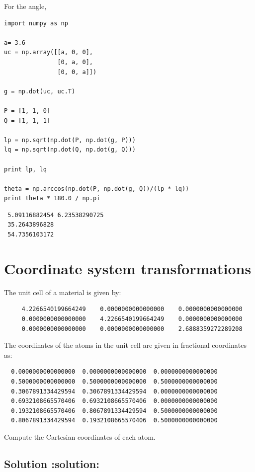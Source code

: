 \documentclass{article}
\begin{document}
For the angle, 


\begin{verbatim}
import numpy as np

a= 3.6
uc = np.array([[a, 0, 0],
               [0, a, 0],
               [0, 0, a]])

g = np.dot(uc, uc.T)

P = [1, 1, 0]
Q = [1, 1, 1]

lp = np.sqrt(np.dot(P, np.dot(g, P)))
lq = np.sqrt(np.dot(Q, np.dot(g, Q)))

print lp, lq

theta = np.arccos(np.dot(P, np.dot(g, Q))/(lp * lq))
print theta * 180.0 / np.pi
\end{verbatim}

\begin{verbatim}
 5.09116882454 6.23538290725
 35.2643896828
 54.7356103172
\end{verbatim}
\section{Coordinate system transformations}
\label{sec-3}


The unit cell of a material is given by:

\begin{verbatim}
     4.2266540199664249    0.0000000000000000    0.0000000000000000
     0.0000000000000000    4.2266540199664249    0.0000000000000000
     0.0000000000000000    0.0000000000000000    2.6888359272289208
\end{verbatim}

The coordinates of the atoms in the unit cell are given in fractional coordinates as:

\begin{verbatim}
  0.0000000000000000  0.0000000000000000  0.0000000000000000
  0.5000000000000000  0.5000000000000000  0.5000000000000000
  0.3067891334429594  0.3067891334429594  0.0000000000000000
  0.6932108665570406  0.6932108665570406  0.0000000000000000
  0.1932108665570406  0.8067891334429594  0.5000000000000000
  0.8067891334429594  0.1932108665570406  0.5000000000000000
\end{verbatim}

Compute the Cartesian coordinates of each atom.
\subsection{Solution \textbf{:solution:}}
\label{sec-3-1}
\end{document}
